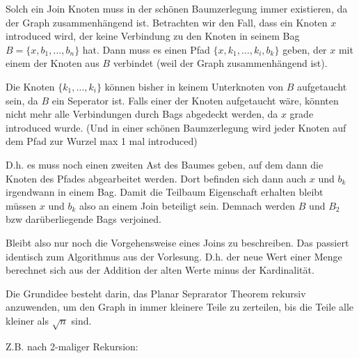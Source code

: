 Solch ein Join Knoten muss in der schönen Baumzerlegung immer existieren, da der Graph zusammenhängend ist.
Betrachten wir den Fall, dass ein Knoten $x$ introduced wird, der keine Verbindung zu den Knoten in seinem Bag $B = \{x, b_1, \dots , b_n\}$ hat.
Dann muss es einen Pfad $\{x, k_1, \dots, k_i, b_k\}$ geben, der $x$ mit einem der Knoten aus $B$ verbindet (weil der Graph zusammenhängend ist).

Die Knoten $\{k_1, \dots, k_i\}$ können bisher in keinem Unterknoten von $B$ aufgetaucht sein, da $B$ ein Seperator ist. Falls einer der Knoten aufgetaucht wäre, könnten nicht mehr alle Verbindungen durch Bags abgedeckt werden, da $x$ grade introduced wurde. (Und in einer schönen Baumzerlegung wird jeder Knoten auf dem Pfad zur Wurzel max 1 mal introduced)

D.h. es muss noch einen zweiten Ast des Baumes geben, auf dem dann die Knoten des Pfades abgearbeitet werden. Dort befinden sich dann auch $x$ und $b_k$ irgendwann in einem Bag. Damit die Teilbaum Eigenschaft erhalten bleibt müssen $x$ und $b_k$ also an einem Join beteiligt sein. Demnach werden $B$ und $B_2$ bzw darüberliegende Bags verjoined.

Bleibt also nur noch die Vorgehensweise eines Joins zu beschreiben. Das passiert identisch zum Algorithmus aus der Vorlesung.
D.h. der neue Wert einer Menge berechnet sich aus der Addition der alten Werte minus der Kardinalität.


Die Grundidee besteht darin, das Planar Seprarator Theorem rekursiv anzuwenden, um den Graph in immer kleinere Teile zu zerteilen, bis die Teile alle kleiner als $\sqrt{n}$ sind.

Z.B. nach 2-maliger Rekursion:

